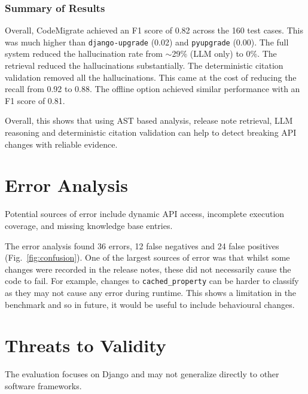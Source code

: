 \documentclass[conference]{IEEEtran}
\begin{document}
\subsubsection{Summary of Results}

Overall, CodeMigrate achieved an F1 score of 0.82 across the 160 test cases. This was much higher
than \texttt{django-upgrade} (0.02) and \texttt{pyupgrade} (0.00). The full system reduced the
hallucination rate from $\sim$29\% (LLM only) to 0\%. The retrieval reduced the hallucinations
substantially. The deterministic citation validation removed all the hallucinations. This came at
the cost of reducing the recall from 0.92 to 0.88. The offline option achieved similar performance
with an F1 score of 0.81.

Overall, this shows that using AST based analysis, release note retrieval, LLM reasoning and
deterministic citation validation can help to detect breaking API changes with reliable evidence.

\section{Error Analysis}


Potential sources of error include dynamic API access,
incomplete execution coverage, and missing knowledge
base entries.

The error analysis found 36 errors, 12 false negatives and 24 false positives
(Fig.~\ref{fig:confusion}). One of the largest
sources of error was that whilst some changes were recorded in the release notes, these did not
necessarily cause the code to fail. For example, changes to \texttt{cached\_property} can be harder to
classify as they may not cause any error during runtime. This shows a limitation in the benchmark and
so in future, it would be useful to include behavioural changes.

\section{Threats to Validity}

The evaluation focuses on Django and may not
generalize directly to other software frameworks.
\end{document}
